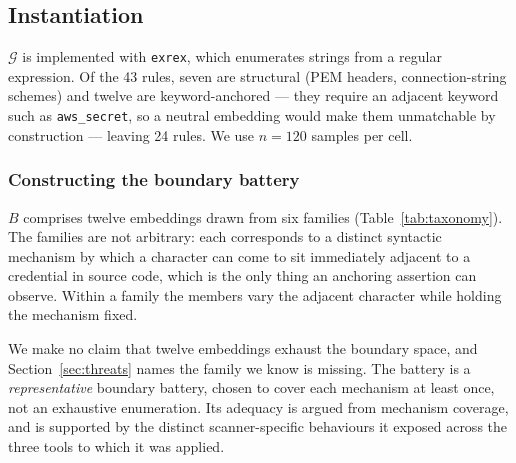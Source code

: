 \documentclass[journal]{IEEEtran}
\begin{document}
\subsection{Instantiation}

$\mathcal{G}$ is implemented with \texttt{exrex}, which enumerates strings from a regular expression. Of the 43 rules, seven are structural (PEM headers, connection-string schemes) and twelve are keyword-anchored --- they require an adjacent keyword such as \texttt{aws\_secret}, so a neutral embedding would make them unmatchable by construction --- leaving 24 rules. We use $n=120$ samples per cell.

\subsubsection*{Constructing the boundary battery}

$B$ comprises twelve embeddings drawn from six families (Table~\ref{tab:taxonomy}). The families are not arbitrary: each corresponds to a distinct syntactic mechanism by which a character can come to sit immediately adjacent to a credential in source code, which is the only thing an anchoring assertion can observe. Within a family the members vary the adjacent character while holding the mechanism fixed.

We make no claim that twelve embeddings exhaust the boundary space, and Section~\ref{sec:threats} names the family we know is missing. The battery is a \emph{representative} boundary battery, chosen to cover each mechanism at least once, not an exhaustive enumeration. Its adequacy is argued from mechanism coverage, and is supported by the distinct scanner-specific behaviours it exposed across the three tools to which it was applied.
\end{document}
